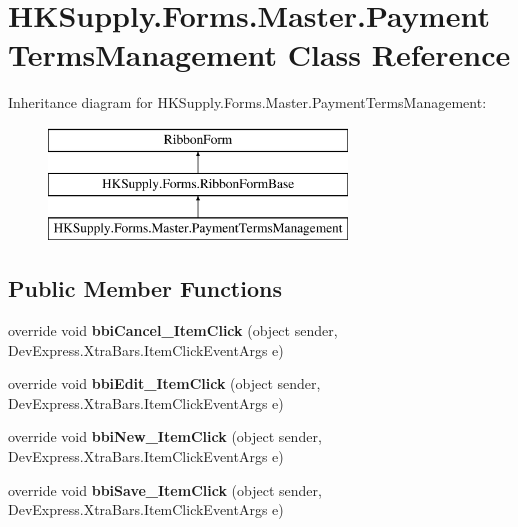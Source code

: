 \hypertarget{class_h_k_supply_1_1_forms_1_1_master_1_1_payment_terms_management}{}\section{H\+K\+Supply.\+Forms.\+Master.\+Payment\+Terms\+Management Class Reference}
\label{class_h_k_supply_1_1_forms_1_1_master_1_1_payment_terms_management}
Inheritance diagram for H\+K\+Supply.\+Forms.\+Master.\+Payment\+Terms\+Management\+:\begin{figure}[H]
\begin{center}
\leavevmode
\includegraphics[height=3.000000cm]{class_h_k_supply_1_1_forms_1_1_master_1_1_payment_terms_management}
\end{center}
\end{figure}
\subsection*{Public Member Functions}
\begin{DoxyCompactItemize}
\item 
\mbox{\label{class_h_k_supply_1_1_forms_1_1_master_1_1_payment_terms_management_a7ce42f24479504395e47edbebe599a8d}} 
override void {\bfseries bbi\+Cancel\+\_\+\+Item\+Click} (object sender, Dev\+Express.\+Xtra\+Bars.\+Item\+Click\+Event\+Args e)
\item 
\mbox{\label{class_h_k_supply_1_1_forms_1_1_master_1_1_payment_terms_management_a9755990625d038588bc3484c9d6447fc}} 
override void {\bfseries bbi\+Edit\+\_\+\+Item\+Click} (object sender, Dev\+Express.\+Xtra\+Bars.\+Item\+Click\+Event\+Args e)
\item 
\mbox{\label{class_h_k_supply_1_1_forms_1_1_master_1_1_payment_terms_management_a449cf3e6515cf8bb358b4c51c998b98e}} 
override void {\bfseries bbi\+New\+\_\+\+Item\+Click} (object sender, Dev\+Express.\+Xtra\+Bars.\+Item\+Click\+Event\+Args e)
\item 
\mbox{\label{class_h_k_supply_1_1_forms_1_1_master_1_1_payment_terms_management_aa149776fe83451d1f24e19792d9f556e}} 
override void {\bfseries bbi\+Save\+\_\+\+Item\+Click} (object sender, Dev\+Express.\+Xtra\+Bars.\+Item\+Click\+Event\+Args e)
\end{DoxyCompactItemize}
